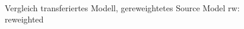 \begin{figure}[tbp]
	\centering
	 \\
	\caption{Vergleich transferiertes Modell, gereweightetes Source Model \newline
		rw: reweighted}
	\label{34,35,24,reweight}
\end{figure}


